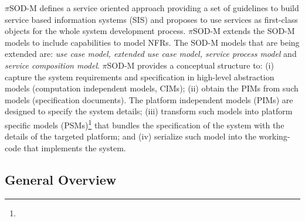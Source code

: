 

$\pi$SOD-M defines a service oriented approach providing a set of guidelines to
build service based information systems (SIS) and proposes to use services as
first-class objects for the whole system development process. $\pi$SOD-M extends
the SOD-M models to include capabilities to model NFRs. The
SOD-M models that are being extended are: \textit{use case model, extended use case model, service
process model} and \textit{service composition model}. $\pi$SOD-M
provides a conceptual structure to: (i) capture the system requirements and specification in
high-level abstraction models (computation independent models, CIMs); (ii)
obtain the PIMs from such models (specification documents). The
platform independent models (PIMs) are designed to specify the system
details; (iii) transform such models into platform specific models
(PSMs)\footnote{} that bundles the
specification of the system with the details of the targeted platform; and (iv)
serialize such model into the working-code that implements the system.




\subsection{General Overview}


